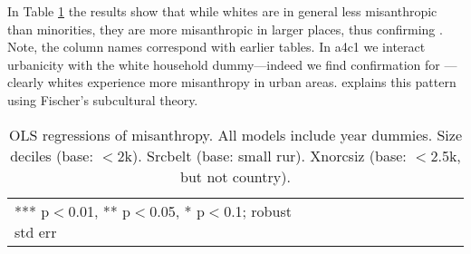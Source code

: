\documentclass[11pt, letterpaper]{article}
\begin{document}
\begin{spacing}{1.4}
In Table \ref{regE} the results show that while whites are in general less misanthropic
than minorities, they are more misanthropic in larger places, thus confirming
\citet{wilson85}. Note, the column names correspond with earlier tables.  
 In a4c1 we interact urbanicity with the white household dummy---indeed we find confirmation for \citet{wilson85}---clearly whites
 experience more misanthropy in urban areas. \citet{wilson85} explains this
 pattern 
 using Fischer's subcultural theory.

 \begin{spacing}{.8}
   \begin{table}[H]\centering
     \caption{OLS regressions  of misanthropy. All models include year
       dummies. Size deciles (base: $<$2k). Srcbelt (base: small rur). Xnorcsiz (base: $<$2.5k, but not country).} \label{regE}
     \begin{scriptsize} \begin{tabular}{p{1.2in}p{.45in}p{.45in}p{.45in}p{.45in}p{.45in}p{.45in}p{.45in}p{.45in}p{.45in}p{.45 in}}\hline
         
         \hline  *** p$<$0.01, ** p$<$0.05, * p$<$0.1; robust std err
       \end{tabular}\end{scriptsize}\end{table}
 \end{spacing}



 
\end{spacing}
\end{document}
